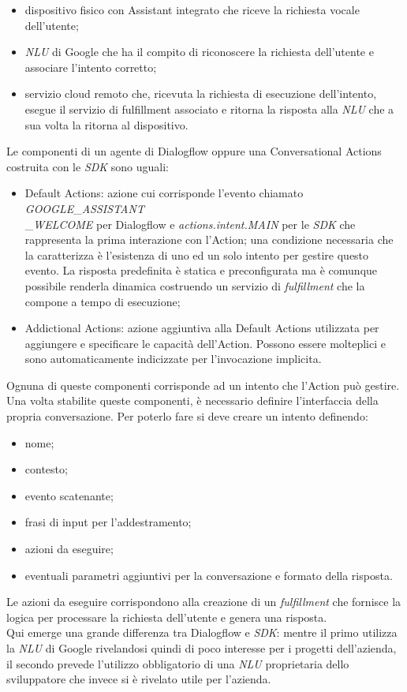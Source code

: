 		\begin{itemize}
			\item dispositivo fisico con Assistant integrato che riceve la richiesta vocale dell'utente;
			\item \textit{NLU} di Google che ha il compito di riconoscere la richiesta dell'utente e associare l'intento corretto;
			\item servizio cloud remoto che, ricevuta la richiesta di esecuzione dell'intento, esegue il servizio di fulfillment associato e ritorna la risposta alla \textit{NLU} che a sua volta la ritorna al dispositivo.
		\end{itemize}
		Le componenti di un agente di Dialogflow oppure una Conversational Actions costruita con le \textit{SDK} sono uguali:
		\begin{itemize}
			\item Default Actions: azione cui corrisponde l'evento chiamato \textit{GOOGLE}\_\textit{ASSISTANT}\\ \_\textit{WELCOME} per Dialogflow e \textit{actions.intent.MAIN} per le \textit{SDK} che rappresenta la prima interazione con l'Action; una condizione necessaria che la caratterizza è l'esistenza di uno ed un solo intento per gestire questo evento. La risposta predefinita è statica e preconfigurata ma è comunque possibile renderla dinamica costruendo un servizio di \textit{fulfillment} che la compone a tempo di esecuzione;
			\item Addictional Actions: azione aggiuntiva alla Default Actions utilizzata per aggiungere e specificare le capacità dell'Action. Possono essere molteplici e sono automaticamente indicizzate per l'invocazione implicita.
		\end{itemize}
		Ognuna di queste componenti corrisponde ad un intento che l'Action può gestire. \\
		Una volta stabilite queste componenti, è necessario definire l'interfaccia della propria conversazione. Per poterlo fare si deve creare un intento definendo:
		\begin{itemize}
			\item nome;
			\item contesto;
			\item evento scatenante;
			\item frasi di input per l'addestramento;
			\item azioni da eseguire;
			\item eventuali parametri aggiuntivi per la conversazione e formato della risposta.
		\end{itemize}
		Le azioni da eseguire corrispondono alla creazione di un \textit{fulfillment} che fornisce la logica per processare la richiesta dell'utente e genera una risposta. \\
		Qui emerge una grande differenza tra Dialogflow e \textit{SDK}: mentre il primo utilizza la \textit{NLU} di Google rivelandosi quindi di poco interesse per i progetti dell'azienda, il secondo prevede l'utilizzo obbligatorio di una \textit{NLU} proprietaria dello sviluppatore che invece si è rivelato utile per l'azienda.

